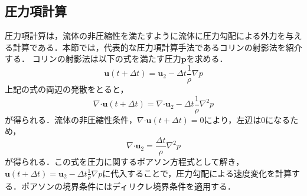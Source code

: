 \documentclass[a4j,12pt]{jreport}
\begin{document}
\subsection{圧力項計算}
圧力項計算は，流体の非圧縮性を満たすように流体に圧力勾配による外力を与える計算である．本節では，代表的な圧力項計算手法であるコリンの射影法\cite{Chorin}を紹介する．
コリンの射影法は以下の式を満たす圧力$\bm{p}$を求める．
\[
	\bm{u} (t + \varDelta t)=  \bm{u}_2 - \varDelta t \frac{1}{\rho}\nabla p
\]
上記の式の両辺の発散をとると，
\[
	\nabla\boldsymbol{\cdot}\bm{u} (t + \varDelta t)=  \nabla\boldsymbol{\cdot}\bm{u}_2 - \varDelta t \frac{1}{\rho}\nabla^2 p
\]
が得られる．流体の非圧縮性条件，$\nabla\boldsymbol{\cdot}\bm{u} (t + \varDelta t)= 0$により，左辺は0になるため，
\begin{equation}
\nabla\boldsymbol{\cdot}\bm{u}_2 = \frac{\varDelta t}{\rho}\nabla^2 p
\end{equation} 
が得られる．この式を圧力に関するポアソン方程式として解き，$\bm{u} (t + \varDelta t)=  \bm{u}_2 - \varDelta t \frac{1}{\rho}\nabla p$に代入することで，圧力勾配による速度変化を計算する．ポアソンの境界条件にはディリクレ境界条件を適用する．


		
		
\end{document}
